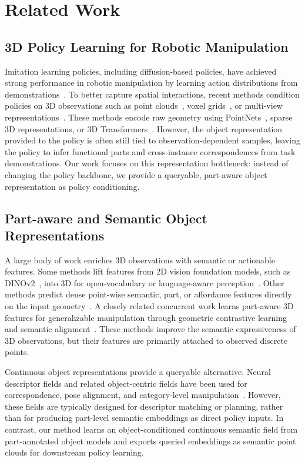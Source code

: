 \section{Related Work}

\subsection{3D Policy Learning for Robotic Manipulation}

Imitation learning policies, including diffusion-based policies, have achieved strong performance in robotic manipulation by learning action distributions from demonstrations~\cite{chi2025diffusion, zhao2023learning, florence2022implicit}. To better capture spatial interactions, recent methods condition policies on 3D observations such as point clouds~\cite{ze20243d, ke20243d}, voxel grids~\cite{shridhar2023perceiver}, or multi-view representations~\cite{goyal2023rvt, chen2025tool, li2025language, tian20253}. These methods encode raw geometry using PointNets~\cite{qi2017pointnet}, sparse 3D representations, or 3D Transformers~\cite{zhao2021point}. However, the object representation provided to the policy is often still tied to observation-dependent samples, leaving the policy to infer functional parts and cross-instance correspondences from task demonstrations. Our work focuses on this representation bottleneck: instead of changing the policy backbone, we provide a queryable, part-aware object representation as policy conditioning.

\subsection{Part-aware and Semantic Object Representations}

A large body of work enriches 3D observations with semantic or actionable features. Some methods lift features from 2D vision foundation models, such as DINOv2~\cite{oquab2023dinov2}, into 3D for open-vocabulary or language-aware perception~\cite{shen2023distilled, wang2023d, chen2025g3flow, fan2026any3d, wang2024gendp}. Other methods predict dense point-wise semantic, part, or affordance features directly on the input geometry~\cite{mo2021where2act, wu2021vat, xu2026action}. A closely related concurrent work learns part-aware 3D features for generalizable manipulation through geometric contrastive learning and semantic alignment~\cite{chen2026learning}. These methods improve the semantic expressiveness of 3D observations, but their features are primarily attached to observed discrete points.

Continuous object representations provide a queryable alternative. Neural descriptor fields and related object-centric fields have been used for correspondence, pose alignment, and category-level manipulation~\cite{simeonov2022neural, pan2023tax}. However, these fields are typically designed for descriptor matching or planning, rather than for producing part-level semantic embeddings as direct policy inputs. In contrast, our method learns an object-conditioned continuous semantic field from part-annotated object models and exports queried embeddings as semantic point clouds for downstream policy learning.
